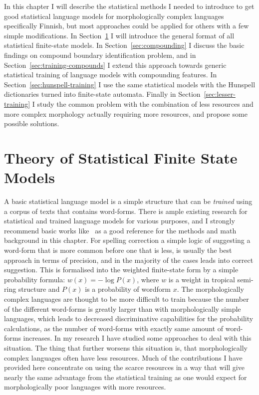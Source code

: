 \documentclass[officiallayout]{unihelcompling}
\begin{document}
In this chapter I will describe the statistical methods I needed to introduce
to get good statistical language models for morphologically complex languages
specifically Finnish, but most approaches could be applied for others with a
few simple modifications. In Section~\ref{sec:statistical} I will introduce the
general format of all statistical finite-state models.  In
Section~\ref{sec:compounding} I discuss the basic findings on compound boundary
identification problem, and in Section~\ref{sec:training-compounds} I extend
this approach towards generic statistical training of language models with
compounding features. In Section~\ref{sec:hunspell-training} I use the same
statistical models with the Hunspell dictionaries turned into finite-state
automata. Finally in Section~\ref{sec:lesser-training} I study the common
problem with the combination of less resources and more complex morphology
actually requiring more resources, and propose some possible solutions.

\section{Theory of Statistical Finite State Models}
\label{sec:statistical}

A basic statistical language model is a simple structure that can be
\emph{trained} using a corpus of texts that contains word-forms. There is ample
existing research for statistical and trained language models for various
purposes, and I strongly recommend basic works
like~\citet{manning1999foundations} as a good reference for the methods and
math background in this chapter.  For spelling correction a simple logic of
suggesting a word-form that is more common before one that is less, is usually
the best approach in terms of precision, and in the majority of the cases leads
into correct suggestion. This is formalised into the weighted finite-state form
by a simple probability formula: $w(x) = -\log P(x)$, where $w$ is a weight in
tropical semi-ring structure and $P(x)$ is a probability of wordform $x$.  The
morphologically complex languages are thought to be more difficult to train
because the number of the different word-forms is greatly larger than with
morphologically simple languages, which leads to decreased discriminative
capabilities for the probability calculations, as the number of word-forms with
exactly same amount of word-forms increases. In my research I have studied some
approaches to deal with this situation. The thing that further worsens this
situation is, that morphologically complex languages often have less resources.
Much of the contributions I have provided here concentrate on using the scarce
resources in a way that will give nearly the same advantage from the
statistical training as one would expect for morphologically poor languages
with more resources.
\end{document}
